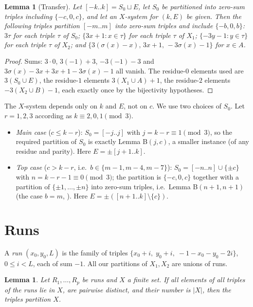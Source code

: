 \documentclass[11pt]{amsart}
\newtheorem{lemma}[theorem]{Lemma}
\theoremstyle{definition}
\theoremstyle{remark}
\newcommand{\Icc}[2]{[#1..#2]}
\begin{document}
\begin{lemma}[Transfer]\label{lem:transfer}
Let $\Icc{-k}{k}=S_0\sqcup E$, let $S_0$ be partitioned into zero-sum triples including $\{-c,0,c\}$, and let an
$X$-system for $(k,E)$ be given. Then the following triples partition $\Icc{-m}{m}$ into zero-sum triples and
include $\{-b,0,b\}$:
$3\tau$ for each triple $\tau$ of $S_0$; $\{3x+1:x\in\tau\}$ for each triple $\tau$ of $X_1$;
$\{-3y-1:y\in\tau\}$ for each triple $\tau$ of $X_2$; and $\{3(\sigma(x)-x),\,3x+1,\,-3\sigma(x)-1\}$ for $x\in A$.
\end{lemma}

\begin{proof}
Sums: $3\cdot0$, $3(-1)+3$, $-3(-1)-3$ and $3\sigma(x)-3x+3x+1-3\sigma(x)-1$ all vanish. The residue-$0$ elements used
are $3(S_0\cup E)$, the residue-$1$ elements $3(X_1\cup A)+1$, the residue-$2$ elements $-3(X_2\cup B)-1$, each
exactly once by the bijectivity hypotheses.
\end{proof}

The $X$-system depends only on $k$ and $E$, not on $c$. We use two choices of $S_0$. Let $r=1,2,3$ according as
$k\equiv 2,0,1\pmod 3$.

\begin{itemize}
\item \emph{Main case} ($c\le k-r$): $S_0=\Icc{-j}{j}$ with $j=k-r\equiv1\pmod 3$, so the required partition of
$S_0$ is exactly Lemma B$(j,c)$, a smaller instance (of any residue and parity). Here $E=\pm\Icc{j+1}{k}$.
\item \emph{Top case} ($c>k-r$, i.e.\ $b\in\{m-1,m-4,m-7\}$): $S_0=\Icc{-n}{n}\cup\{\pm c\}$ with
$n=k-r-1\equiv0\pmod3$; the partition is $\{-c,0,c\}$ together with a partition of $\{\pm1,\dots,\pm n\}$ into
zero-sum triples, i.e.\ Lemma B$(n+1,n+1)$ (the case $b=m$, \cite[Lemma~1]{GN}). Here
$E=\pm(\Icc{n+1}{k}\setminus\{c\})$.
\end{itemize}

\section{Runs}\label{sec:runs}

A \emph{run} $(x_0,y_0,L)$ is the family of triples $\{x_0+i,\;y_0+i,\;-1-x_0-y_0-2i\}$, $0\le i<L$, each of sum
$-1$. All our partitions of $X_1,X_2$ are unions of runs.

\begin{lemma}\label{lem:runs}
Let $R_1,\dots,R_p$ be runs and $X$ a finite set. If all elements of all triples of the runs lie in $X$, are pairwise
distinct, and their number is $|X|$, then the triples partition $X$.
\end{lemma}
\end{document}
